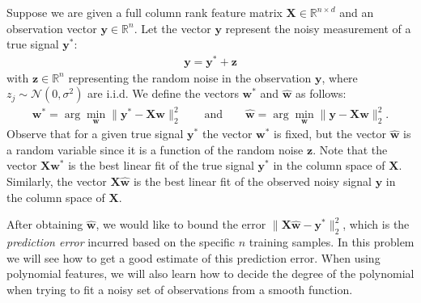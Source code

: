 \documentclass{article}\usepackage[utf8]{inputenc}\usepackage[margin=0.4cm,top=0.4cm,bottom=0.4cm]{geometry}\usepackage[usenames,dvipsnames,svgnames,table]{xcolor}
\begin{document}
\noindent Suppose we are given a full column rank feature matrix $\mathbf{X} \in \mathbb{R}^{n \times d}$ and an observation vector $\mathbf{y}\in \mathbb{R}^n$. Let the vector $\mathbf y$ represent the noisy measurement of a true signal $\mathbf{y}^*$: \begin{align}  \mathbf{y} = {\mathbf{y}^*} + \mathbf{z}  \label{eq:model} \end{align} with $\mathbf{z} \in \mathbb{R}^n$ representing the random noise in the observation $\mathbf{y}$, where $z_j \sim \mathcal{N}(0,\sigma^2)$ are i.i.d. We define the vectors $\mathbf{w}^*$ and $\hat{\mathbf{w}}$ as follows: \begin{align*} \mathbf{w}^* = \arg\min_{\mathbf {w}} \| \mathbf {y}^* - \mathbf{X} \mathbf {w} \|_2^2\quad\quad\text{and}\quad\quad \hat{\mathbf {w}} = \arg\min_{\mathbf {w}} \| \mathbf{y} - \mathbf{X} \mathbf{w}\|_2^2. \end{align*} Observe that for a given true signal $\mathbf{y}^*$ the vector $\mathbf{w}^*$ is fixed, but the vector $\hat{\mathbf w}$ is a random variable since it is a function of the random noise $\mathbf z$. Note that the vector $\mathbf{X}\mathbf{w}^*$ is the best linear fit of the true signal $\mathbf{y}^*$ in the column space of $\mathbf{X}$. Similarly, the vector $\mathbf{X} \hat{\mathbf{w}}$ is the best linear fit of the observed noisy signal $\mathbf{y}$ in the column space of $\mathbf{X}$.
\vspace{4pt}

\noindent After obtaining $\hat{\mathbf{w}}$, we would like to bound the error $\| \mathbf{X} \hat{\mathbf{w}} - \mathbf{y}^*\|_2^2$, which is the \emph{prediction error} incurred based on the specific $n$ training samples. In this problem we will see how to get a good estimate of this prediction error. When using polynomial features, we will also learn how to decide the degree of the polynomial when trying to fit a noisy set of observations from a smooth function.
\vspace{4pt}
\end{document}
